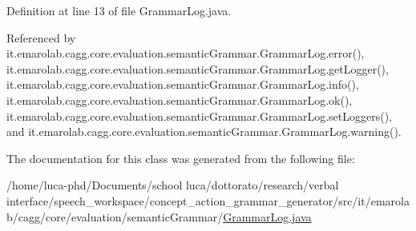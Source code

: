 Definition at line 13 of file Grammar\-Log.\-java.



Referenced by it.\-emarolab.\-cagg.\-core.\-evaluation.\-semantic\-Grammar.\-Grammar\-Log.\-error(), it.\-emarolab.\-cagg.\-core.\-evaluation.\-semantic\-Grammar.\-Grammar\-Log.\-get\-Logger(), it.\-emarolab.\-cagg.\-core.\-evaluation.\-semantic\-Grammar.\-Grammar\-Log.\-info(), it.\-emarolab.\-cagg.\-core.\-evaluation.\-semantic\-Grammar.\-Grammar\-Log.\-ok(), it.\-emarolab.\-cagg.\-core.\-evaluation.\-semantic\-Grammar.\-Grammar\-Log.\-set\-Loggers(), and it.\-emarolab.\-cagg.\-core.\-evaluation.\-semantic\-Grammar.\-Grammar\-Log.\-warning().



The documentation for this class was generated from the following file\-:\begin{DoxyCompactItemize}
\item 
/home/luca-\/phd/\-Documents/school luca/dottorato/research/verbal interface/speech\-\_\-workspace/concept\-\_\-action\-\_\-grammar\-\_\-generator/src/it/emarolab/cagg/core/evaluation/semantic\-Grammar/\hyperlink{GrammarLog_8java}{Grammar\-Log.\-java}\end{DoxyCompactItemize}
